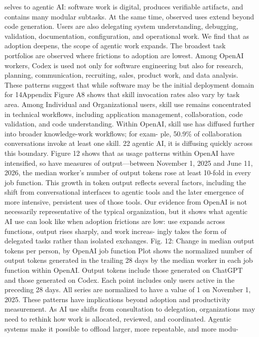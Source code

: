 selves to agentic AI: software work is digital, produces verifiable artifacts, and contains many modular
subtasks. At the same time, observed uses extend beyond code generation. Users are also delegating
system understanding, debugging, validation, documentation, configuration, and operational work.
We find that as adoption deepens, the scope of agentic work expands. The broadest task portfolios
are observed where frictions to adoption are lowest. Among OpenAI workers, Codex is used not only for
software engineering but also for research, planning, communication, recruiting, sales, product work,
and data analysis. These patterns suggest that while software may be the initial deployment domain for
14Appendix Figure A8 shows that skill invocation rates also vary by task area. Among Individual and Organizational users,
skill use remains concentrated in technical workflows, including application management, collaboration, code validation,
and code understanding. Within OpenAI, skill use has diffused further into broader knowledge-work workflows; for exam-
ple, 50.9\% of collaboration conversations invoke at least one skill.
22
agentic AI, it is diffusing quickly across this boundary. Figure 12 shows that as usage patterns within
OpenAI have intensified, so have measures of output—between November 1, 2025 and June 11, 2026,
the median worker’s number of output tokens rose at least 10-fold in every job function. This growth in
token output reflects several factors, including the shift from conversational interfaces to agentic tools
and the later emergence of more intensive, persistent uses of those tools. Our evidence from OpenAI is
not necessarily representative of the typical organization, but it shows what agentic AI use can look like
when adoption frictions are low: use expands across functions, output rises sharply, and work increas-
ingly takes the form of delegated tasks rather than isolated exchanges.
Fig. 12: Change in median output tokens per person, by OpenAI job function
Plot shows the normalized number of output tokens generated in the trailing 28 days by the median worker in each job function
within OpenAI. Output tokens include those generated on ChatGPT and those generated on Codex. Each point includes only
users active in the preceding 28 days. All series are normalized to have a value of 1 on November 1, 2025.
These patterns have implications beyond adoption and productivity measurement. As AI use shifts
from consultation to delegation, organizations may need to rethink how work is allocated, reviewed,
and coordinated. Agentic systems make it possible to offload larger, more repeatable, and more modu-
